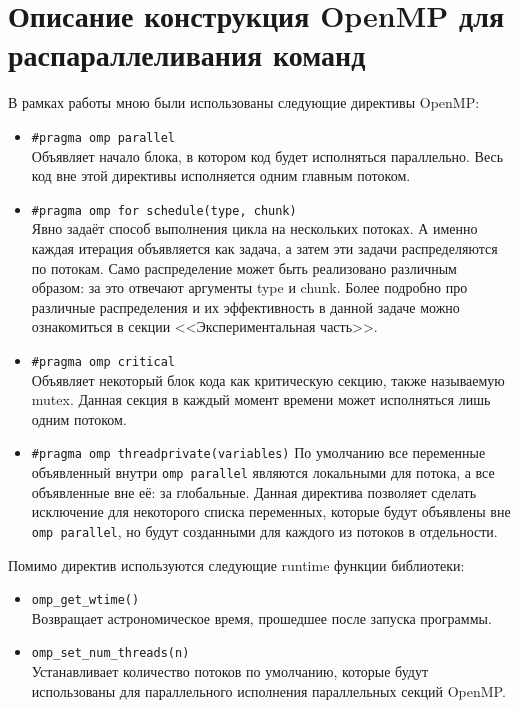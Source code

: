 \documentclass[14pt, russian, onesize]{extreport}
\begin{document}
\section*{Описание конструкция OpenMP для распараллеливания команд}
В рамках работы мною были использованы следующие директивы OpenMP:
\begin{itemize}
    \item \texttt{\#pragma omp parallel}\\
        Объявляет начало блока, в котором код будет исполняться параллельно.
        Весь код вне этой директивы исполняется одним главным потоком. 
    \item \texttt{\#pragma omp for schedule(type, chunk)}\\
        Явно задаёт способ выполнения цикла на нескольких потоках. А именно
        каждая итерация объявляется как задача, а затем эти задачи распределяются
        по потокам. Само распределение может быть реализовано различным образом:
        за это отвечают аргументы type и chunk. Более подробно про различные
        распределения и их эффективность в данной задаче можно ознакомиться
        в секции <<Экспериментальная часть>>.
    \item \texttt{\#pragma omp critical}\\
        Объявляет некоторый блок кода как критическую секцию, также называемую
        mutex. Данная секция в каждый момент времени может исполняться лишь 
        одним потоком.
    \item \texttt{\#pragma omp threadprivate(variables)}
        По умолчанию все переменные объявленный внутри \texttt{omp parallel}
        являются локальными для потока, а все объявленные вне её: за 
        глобальные. Данная директива позволяет сделать исключение для 
        некоторого списка переменных, которые будут объявлены вне 
        \texttt{omp parallel}, но будут созданными для каждого
        из потоков в отдельности.
\end{itemize}
Помимо директив используются следующие runtime функции библиотеки:
\begin{itemize}
    \item \texttt{omp\_get\_wtime()}\\
        Возвращает астрономическое время, прошедшее после запуска
        программы. 
    \item \texttt{omp\_set\_num\_threads(n)}\\
        Устанавливает количество потоков по умолчанию, которые будут
        использованы для параллельного исполнения параллельных секций OpenMP.
\end{itemize}
\end{document}
